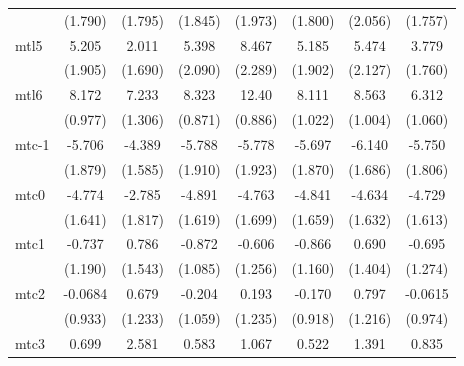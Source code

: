 \documentclass{article}
\begin{document}
{\begin{longtable}{l*{7}{c}}
                &  (1.790)         &  (1.795)         &  (1.845)         &  (1.973)         &  (1.800)         &  (2.056)         &  (1.757)         \\
mtl5            &    5.205\sym{*}  &    2.011         &    5.398\sym{*}  &    8.467\sym{***}&    5.185\sym{*}  &    5.474\sym{*}  &    3.779\sym{*}  \\
                &  (1.905)         &  (1.690)         &  (2.090)         &  (2.289)         &  (1.902)         &  (2.127)         &  (1.760)         \\
mtl6            &    8.172\sym{***}&    7.233\sym{***}&    8.323\sym{***}&    12.40\sym{***}&    8.111\sym{***}&    8.563\sym{***}&    6.312\sym{***}\\
                &  (0.977)         &  (1.306)         &  (0.871)         &  (0.886)         &  (1.022)         &  (1.004)         &  (1.060)         \\
mtc-1           &   -5.706\sym{**} &   -4.389\sym{**} &   -5.788\sym{**} &   -5.778\sym{**} &   -5.697\sym{**} &   -6.140\sym{**} &   -5.750\sym{**} \\
                &  (1.879)         &  (1.585)         &  (1.910)         &  (1.923)         &  (1.870)         &  (1.686)         &  (1.806)         \\
mtc0            &   -4.774\sym{**} &   -2.785         &   -4.891\sym{**} &   -4.763\sym{**} &   -4.841\sym{**} &   -4.634\sym{**} &   -4.729\sym{**} \\
                &  (1.641)         &  (1.817)         &  (1.619)         &  (1.699)         &  (1.659)         &  (1.632)         &  (1.613)         \\
mtc1            &   -0.737         &    0.786         &   -0.872         &   -0.606         &   -0.866         &    0.690         &   -0.695         \\
                &  (1.190)         &  (1.543)         &  (1.085)         &  (1.256)         &  (1.160)         &  (1.404)         &  (1.274)         \\
mtc2            &  -0.0684         &    0.679         &   -0.204         &    0.193         &   -0.170         &    0.797         &  -0.0615         \\
                &  (0.933)         &  (1.233)         &  (1.059)         &  (1.235)         &  (0.918)         &  (1.216)         &  (0.974)         \\
mtc3            &    0.699         &    2.581         &    0.583         &    1.067         &    0.522         &    1.391         &    0.835         \\

\end{longtable}}
\end{document}
